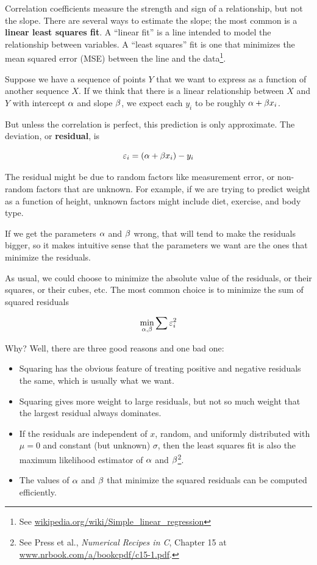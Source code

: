 \documentclass[12pt]{book}
\begin{document}
Correlation coefficients measure the strength and sign of a
relationship, but not the slope.  There are several ways to estimate
the slope; the most common is a {\bf linear least squares fit}.  A
``linear fit'' is a line intended to model the relationship between
variables.  A ``least squares'' fit is one that minimizes the mean
squared error (MSE) between the line and the data\footnote{See
  \url{wikipedia.org/wiki/Simple_linear_regression}}.

Suppose we have a sequence of points $Y$ that we want to express
as a function of another sequence $X$.  If we think that there is
a linear relationship between $X$ and $Y$ with intercept $\alpha$
and slope $\beta$, we expect each $y_i$ to be roughly $\alpha + \beta x_i$.

But unless the correlation is perfect, this prediction is only
approximate.  The deviation, or {\bf residual}, is 

\newcommand{\eps}{\varepsilon}

\[ \eps_i = (\inter + \slope x_i) - y_i \]

The residual might be due to random factors like measurement error,
or non-random factors that are unknown.  For example, if we are
trying to predict weight as a function of height, unknown factors
might include diet, exercise, and body type.

If we get the parameters $\alpha$ and $\beta$ wrong, that will tend
to make the residuals bigger, so it makes intuitive sense that the
parameters we want are the ones that minimize the residuals.

As usual, we could choose to minimize the absolute value of the
residuals, or their squares, or their cubes, etc.  The most common
choice is to minimize the sum of squared residuals

\[ \min_{\inter, \slope} \sum \eps_i^2 \]

Why?  Well, there are three good reasons and one bad one:

\begin{itemize}

\item Squaring has the obvious feature of treating positive and
negative residuals the same, which is usually what we want.

\item Squaring gives more weight to large residuals, but not
so much weight that the largest residual always dominates.

\item If the residuals are independent of $x$, random, and uniformly
  distributed with $\mu=0$ and constant (but unknown) $\sigma$, then
  the least squares fit is also the maximum likelihood estimator of
  $\alpha$ and $\beta$\footnote{See Press et al., {\em Numerical Recipes in C},
    Chapter 15 at \url{www.nrbook.com/a/bookcpdf/c15-1.pdf}.}.

\item The values of $\alpha$ and $\beta$ that minimize the squared
  residuals can be computed efficiently.

\end{itemize}
\end{document}
